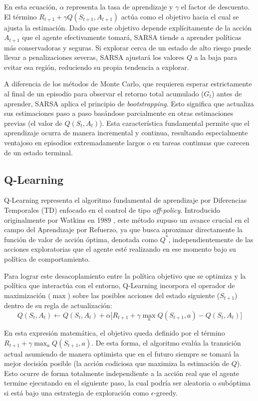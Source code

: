 En esta ecuación, $\alpha$ representa la tasa de aprendizaje y $\gamma$ el factor de descuento. El término $R_{t+1} + \gamma Q(S_{t+1}, A_{t+1})$ actúa como el objetivo hacia el cual se ajusta la estimación. Dado que este objetivo depende explícitamente de la acción $A_{t+1}$ que el agente efectivamente tomará, SARSA tiende a aprender políticas más conservadoras y seguras. Si explorar cerca de un estado de alto riesgo puede llevar a penalizaciones severas, SARSA ajustará los valores $Q$ a la baja para evitar esa región, reduciendo su propia tendencia a explorar.

A diferencia de los métodos de Monte Carlo, que requieren esperar estrictamente al final de un episodio para observar el retorno total acumulado ($G_t$) antes de aprender, SARSA aplica el principio de \textit{bootstrapping}. Esto significa que actualiza sus estimaciones paso a paso basándose parcialmente en otras estimaciones previas (el valor de $Q(S_{t}, A_{t})$). Esta característica fundamental permite que el aprendizaje ocurra de manera incremental y continua, resultando especialmente ventajoso en episodios extremadamente largos o en tareas continuas que carecen de un estado terminal.

\subsection{Q-Learning}

Q-Learning representa el algoritmo fundamental de aprendizaje por Diferencias Temporales (TD) enfocado en el control de tipo \textit{off-policy}. Introducido originalmente por Watkins en 1989 \cite{watkins1989learning}, este método supuso un avance crucial en el campo del Aprendizaje por Refuerzo, ya que busca aproximar directamente la función de valor de acción óptima, denotada como $Q^*$, independientemente de las acciones exploratorias que el agente esté realizando en ese momento bajo su política de comportamiento.

Para lograr este desacoplamiento entre la política objetivo que se optimiza y la política que interactúa con el entorno, Q-Learning incorpora el operador de maximización ($\max$) sobre las posibles acciones del estado siguiente ($S_{t+1}$) dentro de su regla de actualización:
\begin{equation*}
Q(S_t, A_t) \leftarrow Q(S_t, A_t) + \alpha \Big[ R_{t+1} + \gamma \max_{a} Q(S_{t+1}, a) - Q(S_t, A_t) \Big]
\end{equation*}

En esta expresión matemática, el objetivo queda definido por el término $R_{t+1} + \gamma \max_{a} Q(S_{t+1}, a)$. De esta forma, el algoritmo evalúa la transición actual asumiendo de manera optimista que en el futuro siempre se tomará la mejor decisión posible (la acción codiciosa que maximiza la estimación de $Q$). Esto ocurre de forma totalmente independiente a la acción real que el agente termine ejecutando en el siguiente paso, la cual podría ser aleatoria o subóptima si está bajo una estrategia de exploración como $\epsilon$-greedy.

